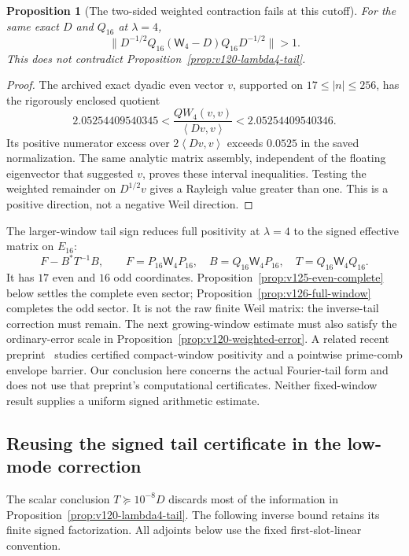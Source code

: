 \documentclass[11pt]{article}
\newtheorem{proposition}[theorem]{Proposition}
\theoremstyle{remark}
\newcommand{\ip}[2]{\left\langle #1,#2\right\rangle}
\begin{document}
\begin{proposition}[The two-sided weighted contraction fails at this cutoff]
\label{prop:v120-norm-counterexample}
For the same exact $D$ and $Q_{16}$ at $\lambda=4$,
\[
 \|D^{-1/2}Q_{16}(\mathsf W_4-D)Q_{16}D^{-1/2}\|>1.
\]
This does not contradict Proposition~\ref{prop:v120-lambda4-tail}.
\end{proposition}
\begin{proof}
The archived exact dyadic even vector $v$, supported on
$17\le|n|\le256$, has the rigorously enclosed quotient
\[
 2.05254409540345<\frac{QW_4(v,v)}{\ip{Dv}{v}}
                         <2.05254409540346.
\]
Its positive numerator excess over $2\ip{Dv}{v}$ exceeds
$0.0525$ in the saved normalization. The same analytic matrix
assembly, independent of the floating eigenvector that suggested
$v$, proves these interval inequalities. Testing the weighted
remainder on $D^{1/2}v$ gives a Rayleigh value greater than one.
This is a positive direction, not a negative Weil direction.
\end{proof}

The larger-window tail sign reduces full positivity at $\lambda=4$
to the signed effective matrix on
$E_{16}$:
\[
 F-B^*T^{-1}B,\qquad
 F=P_{16}\mathsf W_4P_{16},\quad B=Q_{16}\mathsf W_4P_{16},
 \quad T=Q_{16}\mathsf W_4Q_{16}.
\]
It has $17$ even and $16$ odd coordinates.
Proposition~\ref{prop:v125-even-complete} below settles the complete
even sector; Proposition~\ref{prop:v126-full-window} completes the
odd sector. It is not the raw finite
Weil matrix: the inverse-tail correction must remain.
The next growing-window estimate must also satisfy the ordinary-error
scale in Proposition~\ref{prop:v120-weighted-error}.
A related recent preprint~\cite{Zhu2026Windows} studies certified
compact-window positivity and a pointwise prime-comb envelope barrier.
Our conclusion here concerns the actual Fourier-tail form and does
not use that preprint's computational certificates. Neither fixed-window
result supplies a uniform signed arithmetic estimate.

\subsection*{Reusing the signed tail certificate in the low-mode correction}
The scalar conclusion $T\succeq10^{-8}D$ discards most of the
information in Proposition~\ref{prop:v120-lambda4-tail}. The following
inverse bound retains its finite signed factorization. All adjoints
below use the fixed first-slot-linear convention.
\end{document}

